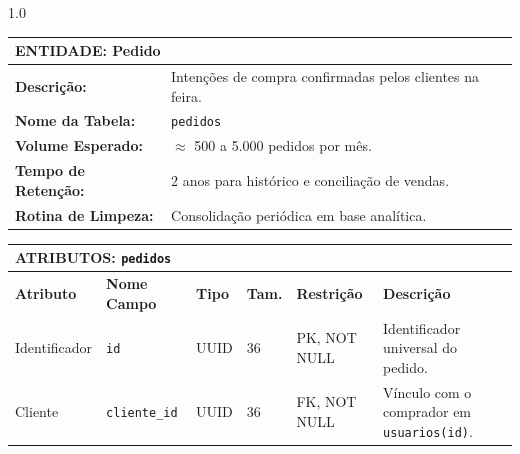 \documentclass[12pt,a4paper]{article}
\begin{document}
\newpage


\begin{spacing}{1.0}

\small

\noindent

\begin{tabularx}{\textwidth}{|p{3.0cm}|X|}

\hline

\multicolumn{2}{|l|}{\textbf{ENTIDADE: Pedido}} \\ \hline

\textbf{Descrição:} & Intenções de compra confirmadas pelos clientes na feira. \\ \hline

\textbf{Nome da Tabela:} & \texttt{pedidos} \\ \hline

\textbf{Volume Esperado:} & $\approx$ 500 a 5.000 pedidos por mês. \\ \hline

\textbf{Tempo de Retenção:} & 2 anos para histórico e conciliação de vendas. \\ \hline

\textbf{Rotina de Limpeza:} & Consolidação periódica em base analítica. \\ \hline

\end{tabularx}

\vspace{0.25cm}

\noindent

\begin{tabularx}{\textwidth}{|p{1.6cm}|p{1.9cm}|p{1.2cm}|p{0.7cm}|p{1.9cm}|X|}

\hline

\multicolumn{6}{|l|}{\textbf{ATRIBUTOS: \texttt{pedidos}}} \\ \hline

\textbf{Atributo} & \textbf{Nome Campo} & \textbf{Tipo} & \textbf{Tam.} & \textbf{Restrição} & \textbf{Descrição} \\ \hline

Identificador & \texttt{id} & UUID & 36 & PK, NOT NULL & Identificador universal do pedido. \\ \hline

Cliente & \texttt{cliente\_id} & UUID & 36 & FK, NOT NULL & Vínculo com o comprador em \texttt{usuarios(id)}. \\ \hline


\end{tabularx}
\end{spacing}
\end{document}
